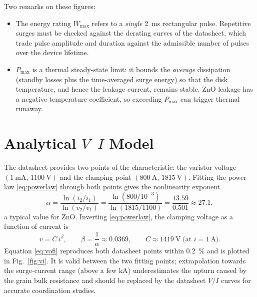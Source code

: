 \documentclass[11pt,a4paper]{article}
\begin{document}
Two remarks on these figures:
%
\begin{itemize}
  \item The energy rating $W_\mathrm{max}$ refers to a \emph{single}
  \SI{2}{\milli\second} rectangular pulse. Repetitive surges must be checked
  against the derating curves of the datasheet, which trade pulse amplitude
  and duration against the admissible number of pulses over the device
  lifetime.
  \item $P_\mathrm{max}$ is a thermal steady-state limit: it bounds the
  \emph{average} dissipation (standby losses plus the time-averaged surge
  energy) so that the disk temperature, and hence the leakage current,
  remains stable. ZnO leakage has a negative temperature coefficient, so
  exceeding $P_\mathrm{max}$ can trigger thermal runaway.
\end{itemize}

\section{Analytical $V$--$I$ Model}

The datasheet provides two points of the characteristic: the varistor
voltage $(\SI{1}{\milli\ampere},\,\SI{1100}{\volt})$ and the clamping point
$(\SI{800}{\ampere},\,\SI{1815}{\volt})$. Fitting the power law
\eqref{eq:powerlaw} through both points gives the nonlinearity exponent
%
\begin{equation}
  \alpha
  = \frac{\ln(i_2/i_1)}{\ln(v_2/v_1)}
  = \frac{\ln\!\left(800/10^{-3}\right)}{\ln\!\left(1815/1100\right)}
  = \frac{13.59}{0.501}
  \approx 27.1 ,
\end{equation}
%
a typical value for ZnO. Inverting \eqref{eq:powerlaw}, the clamping voltage
as a function of current is
%
\begin{equation}
  v = C\, i^{\beta},
  \qquad
  \beta = \frac{1}{\alpha} \approx 0.0369,
  \qquad
  C \approx \SI{1419}{\volt} \;\text{(at $i = \SI{1}{\ampere}$)} .
  \label{eq:vofi}
\end{equation}
%
Equation \eqref{eq:vofi} reproduces both datasheet points within
\SI{0.2}{\percent} and is plotted in Fig.~\ref{fig:vi}. It is valid between
the two fitting points; extrapolation towards the surge-current range
(above a few \si{\kilo\ampere}) underestimates the upturn caused by the
grain bulk resistance and should be replaced by the datasheet $V/I$ curves
for accurate coordination studies.
\end{document}
